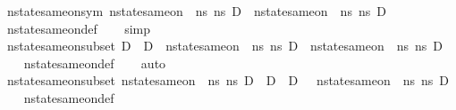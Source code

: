 \begin{isabellebody}
\ nstate{\isacharunderscore}{\kern0pt}same{\isacharunderscore}{\kern0pt}on{\isacharunderscore}{\kern0pt}sym{\isacharcolon}{\kern0pt}\ {\isachardoublequoteopen}nstate{\isacharunderscore}{\kern0pt}same{\isacharunderscore}{\kern0pt}on\ {\isasymLambda}\ ns{}\ ns{}\ D\ {\isasymLongrightarrow}\ nstate{\isacharunderscore}{\kern0pt}same{\isacharunderscore}{\kern0pt}on\ {\isasymLambda}\ ns{}\ ns{}\ D{\isachardoublequoteclose}\isanewline
%
\isadelimproof
\ \ %
\endisadelimproof
%
\isatagproof
{}\isamarkupfalse%
\ nstate{\isacharunderscore}{\kern0pt}same{\isacharunderscore}{\kern0pt}on{\isacharunderscore}{\kern0pt}def\isanewline
\ \ \isamarkupfalse%
\ simp%
\endisatagproof
{\isafoldproof}%
%
\isadelimproof
\isanewline
%
\endisadelimproof
\isanewline
{}\isamarkupfalse%
\ nstate{\isacharunderscore}{\kern0pt}same{\isacharunderscore}{\kern0pt}on{\isacharunderscore}{\kern0pt}subset{\isacharcolon}{\kern0pt}\ {\isachardoublequoteopen}D{}\ {\isasymsubseteq}\ D{}\ {\isasymLongrightarrow}\ nstate{\isacharunderscore}{\kern0pt}same{\isacharunderscore}{\kern0pt}on\ {\isasymLambda}\ ns{}\ ns{}\ D{}\ {\isasymLongrightarrow}\ nstate{\isacharunderscore}{\kern0pt}same{\isacharunderscore}{\kern0pt}on\ {\isasymLambda}\ ns{}\ ns{}\ D{}{\isachardoublequoteclose}\isanewline
%
\isadelimproof
\ \ %
\endisadelimproof
%
\isatagproof
{}\isamarkupfalse%
\ nstate{\isacharunderscore}{\kern0pt}same{\isacharunderscore}{\kern0pt}on{\isacharunderscore}{\kern0pt}def\isanewline
\ \ \isamarkupfalse%
\ auto%
\endisatagproof
{\isafoldproof}%
%
\isadelimproof
\isanewline
%
\endisadelimproof
\isanewline
{}\isamarkupfalse%
\ nstate{\isacharunderscore}{\kern0pt}same{\isacharunderscore}{\kern0pt}on{\isacharunderscore}{\kern0pt}subset{\isacharunderscore}{\kern0pt}{}{\isacharcolon}{\kern0pt}\ {\isachardoublequoteopen}nstate{\isacharunderscore}{\kern0pt}same{\isacharunderscore}{\kern0pt}on\ {\isasymLambda}\ ns{}\ ns{}\ D{}\ {\isasymLongrightarrow}\ D{}\ {\isasymsubseteq}\ D{}\ \ {\isasymLongrightarrow}\ nstate{\isacharunderscore}{\kern0pt}same{\isacharunderscore}{\kern0pt}on\ {\isasymLambda}\ ns{}\ ns{}\ D{}{\isachardoublequoteclose}\isanewline
%
\isadelimproof
\ \ %
\endisadelimproof
%
\isatagproof
{}\isamarkupfalse%
\ nstate{\isacharunderscore}{\kern0pt}same{\isacharunderscore}{\kern0pt}on{\isacharunderscore}{\kern0pt}def\isanewline

\end{isabellebody}
